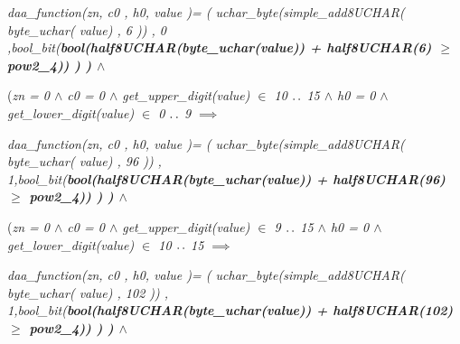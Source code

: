 \documentclass[11pt]{article}
\begin{document}
\begin{sloppypar}
\hspace*{0.80in}\it daa\_function\rm (\it zn\rm , \it c0 \rm , \it h0\hspace*{0.10in}\rm , \it value \rm )\rm = \rm ( \it uchar\_byte\rm (\it simple\_add8UCHAR\rm ( \it byte\_uchar\rm ( \it value\rm ) \rm , \rm 6 \rm )\rm ) \rm , \rm 0 \rm ,\hspace*{0.10in}\it bool\_bit\rm (\bf bool\rm (\hspace*{0.15in}\it half8UCHAR\rm (\it byte\_uchar\rm (\it value\rm )\rm ) \rm + \it half8UCHAR\rm (\rm 6\rm )  $\geq$  \it pow2\_4\rm )\rm ) \rm ) \rm ) $\land$ 

\hspace*{0.60in}\rm (\hspace*{0.10in}\it zn \rm = \rm 0  $\land$  \it c0 \rm = \rm 0  $\land$  \it get\_upper\_digit\rm (\it value\rm )  $\in$  \rm 1\rm 0 $\mathbin{\ldotp\ldotp}$ \rm 1\rm 5  $\land$  \it h0 \rm = \rm 0  $\land$  \it get\_lower\_digit\rm (\it value\rm )  $\in$  \rm 0 $\mathbin{\ldotp\ldotp}$ \rm 9  $\implies$ 

\hspace*{0.80in}\it daa\_function\rm (\it zn\rm , \it c0 \rm , \it h0\hspace*{0.10in}\rm , \it value \rm )\rm = \rm ( \it uchar\_byte\rm (\it simple\_add8UCHAR\rm ( \it byte\_uchar\rm ( \it value\rm ) \rm , \rm 9\rm 6 \rm )\rm ) \rm , \rm 1\rm ,\hspace*{0.10in}\it bool\_bit\rm (\bf bool\rm (\hspace*{0.15in}\it half8UCHAR\rm (\it byte\_uchar\rm (\it value\rm )\rm ) \rm + \it half8UCHAR\rm (\rm 9\rm 6\rm )  $\geq$  \it pow2\_4\rm )\rm ) \rm ) \rm ) $\land$ 

\hspace*{0.60in}\rm (\hspace*{0.10in}\it zn \rm = \rm 0  $\land$  \it c0 \rm = \rm 0  $\land$  \it get\_upper\_digit\rm (\it value\rm )  $\in$  \rm 9 $\mathbin{\ldotp\ldotp}$ \rm 1\rm 5  $\land$  \it h0 \rm = \rm 0  $\land$  \it get\_lower\_digit\rm (\it value\rm )  $\in$  \rm 1\rm 0 $\mathbin{\ldotp\ldotp}$ \rm 1\rm 5  $\implies$ 

\hspace*{0.80in}\it daa\_function\rm (\it zn\rm , \it c0 \rm , \it h0\hspace*{0.10in}\rm , \it value \rm )\rm = \rm ( \it uchar\_byte\rm (\it simple\_add8UCHAR\rm ( \it byte\_uchar\rm ( \it value\rm ) \rm , \rm 1\rm 0\rm 2 \rm )\rm ) \rm , \rm 1\rm ,\hspace*{0.10in}\it bool\_bit\rm (\bf bool\rm (\hspace*{0.15in}\it half8UCHAR\rm (\it byte\_uchar\rm (\it value\rm )\rm ) \rm + \it half8UCHAR\rm (\rm 1\rm 0\rm 2\rm )  $\geq$  \it pow2\_4\rm )\rm ) \rm ) \rm ) $\land$ 


\end{sloppypar}
\end{document}
